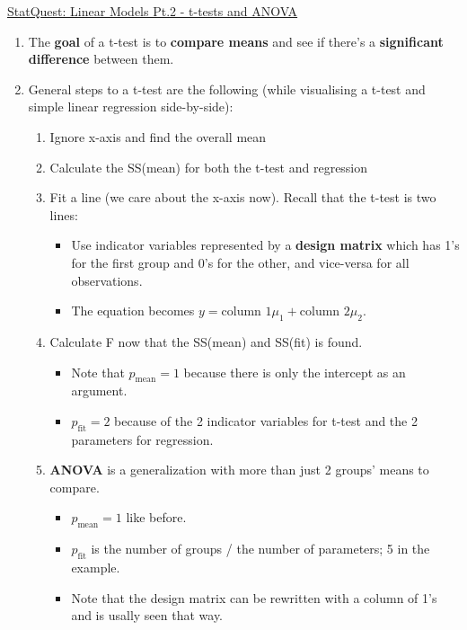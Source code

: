 \documentclass[12pt, titlepage, french]{report}
\begin{document}
\begin{YTB_SUMM}{\href{https://www.youtube.com/watch?v=NF5_btOaCig&list=PLblh5JKOoLUIzaEkCLIUxQFjPIlapw8nU&index=6}{StatQuest: Linear Models Pt.2 - t-tests and ANOVA}}
\begin{enumerate}
	\item	The \textbf{goal} of a t-test is to \textbf{compare means} and see if there's a \textbf{significant difference} between them.
	\item	General steps to a t-test are the following (while visualising a t-test and simple linear regression side-by-side):
	\begin{enumerate}
		\item	Ignore x-axis and find the overall mean
		\item	Calculate the SS(mean) for both the t-test and regression
		\item	Fit a line (we care about the x-axis now). Recall that the t-test is two lines:
		\begin{itemize}
			\item	Use indicator variables represented by a \textbf{design matrix} which has 1's for the first group and 0's for the other, and vice-versa for all observations.
			\item	The equation becomes $y = \text{column 1} \mu_{1} + \text{column 2} \mu_{2}$.
		\end{itemize}
		\item	Calculate F now that the SS(mean) and SS(fit) is found.
		\begin{itemize}
			\item	Note that $p_{\text{mean}} = 1$ because there is only the intercept as an argument.
			\item	$p_{\text{fit}} = 2$ because of the 2 indicator variables for t-test and the 2 parameters for regression.
		\end{itemize}
	\item	\textbf{ANOVA} is a generalization with more than just 2 groups' means to compare.
	\begin{itemize}
		\item	$p_{\text{mean}} = 1$ like before.
		\item	$p_{\text{fit}}$ is the number of groups / the number of parameters; 5 in the example.
		\item	Note that the design matrix can be rewritten with a column of 1's and is usally seen that way.
	\end{itemize}
	\end{enumerate}
\end{enumerate}
\end{YTB_SUMM}
\end{document}
